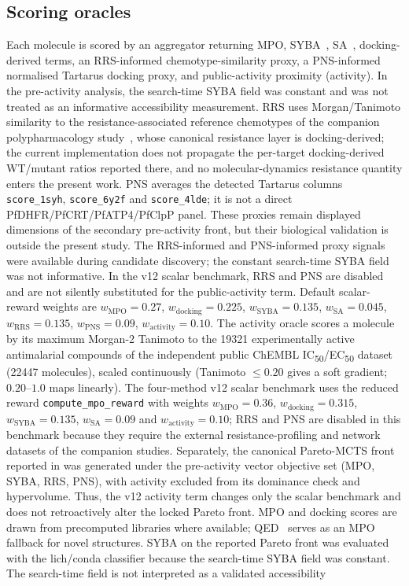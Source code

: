 \documentclass[10pt,a4paper]{article}
\begin{document}
\subsection{Scoring oracles}
\label{sec:oracles}

Each molecule is scored by an aggregator returning MPO, SYBA~\citep{Vorsilak2020}, SA~\citep{Ertl2009}, docking-derived terms, an RRS-informed chemotype-similarity proxy, a PNS-informed normalised Tartarus docking proxy, and public-activity proximity (activity). In the pre-activity analysis, the search-time SYBA field was constant and was not treated as an informative accessibility measurement. RRS uses Morgan/Tanimoto similarity to the resistance-associated reference chemotypes of the companion polypharmacology study~\citep{Temgoua2026b}, whose canonical resistance layer is docking-derived; the current implementation does not propagate the per-target docking-derived WT/mutant ratios reported there, and no molecular-dynamics resistance quantity enters the present work. PNS averages the detected Tartarus columns \texttt{score\_1syh}, \texttt{score\_6y2f} and \texttt{score\_4lde}; it is not a direct PfDHFR/PfCRT/PfATP4/PfClpP panel. These proxies remain displayed dimensions of the secondary pre-activity front, but their biological validation is outside the present study. The RRS-informed and PNS-informed proxy signals were available during candidate discovery; the constant search-time SYBA field was not informative. In the v12 scalar benchmark, RRS and PNS are disabled and are not silently substituted for the public-activity term. Default scalar-reward weights are $w_{\text{MPO}}=\num{0.27}$, $w_{\text{docking}}=\num{0.225}$, $w_{\text{SYBA}}=\num{0.135}$, $w_{\text{SA}}=\num{0.045}$, $w_{\text{RRS}}=\num{0.135}$, $w_{\text{PNS}}=\num{0.09}$, $w_{\text{activity}}=\num{0.10}$. The activity oracle scores a molecule by its maximum Morgan-2 Tanimoto to the \num{19321} experimentally active antimalarial compounds of the independent public ChEMBL IC\textsubscript{50}/EC\textsubscript{50} dataset (\num{22447} molecules), scaled continuously (Tanimoto $\le \num{0.20}$ gives a soft gradient; $\num{0.20}$--$\num{1.0}$ maps linearly). The four-method v12 scalar benchmark uses the reduced reward \texttt{compute\_mpo\_reward} with weights $w_{\text{MPO}}=\num{0.36}$, $w_{\text{docking}}=\num{0.315}$, $w_{\text{SYBA}}=\num{0.135}$, $w_{\text{SA}}=\num{0.09}$ and $w_{\text{activity}}=\num{0.10}$; RRS and PNS are disabled in this benchmark because they require the external resistance-profiling and network datasets of the companion studies. Separately, the canonical Pareto-MCTS front reported in  was generated under the pre-activity vector objective set (MPO, SYBA, RRS, PNS), with activity excluded from its dominance check and hypervolume. Thus, the v12 activity term changes only the scalar benchmark and does not retroactively alter the locked Pareto front. MPO and docking scores are drawn from precomputed libraries where available; QED~\citep{Bickerton2012} serves as an MPO fallback for novel structures. SYBA on the reported Pareto front was evaluated with the lich/conda classifier because the search-time SYBA field was constant. The search-time field is not interpreted as a validated accessibility 
\end{document}
